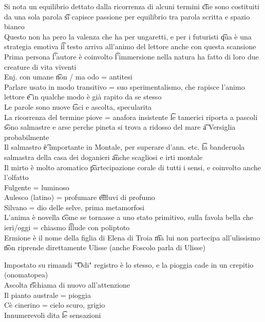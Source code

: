 \documentclass[12pt]{article}
\begin{document}
Si nota un equilibrio dettato dalla ricorrenza di alcuni termini \t che sono costituiti da una sola parola \t si capisce passione per equilibrio tra parola scritta e spazio bianco \\
Questo non ha pero la valenza che ha per ungaretti, e per i futuristi \t qua è una strategia emotiva \t il testo arriva all'animo del lettore anche con questa scansione \\
Prima persona \t l'autore è coinvolto \t l'immersione nella natura ha fatto di loro due creature di vita viventi \\
Enj. con umane \t non / ma odo = antitesi \\
Parlare usato in modo transitivo = suo sperimentalismo, che rapisce l'animo lettore \t e in qualche modo è già rapito da se stesso \\
Le parole sono nuove \t taci e ascolta, specularita \\
La ricorrenza del termine piove = anafora insistente \t le tamerici riporta a pascoli \t sono salmastre e arse perche pineta si trova a ridosso del mare \t a Versiglia probabilmente \\
Il salmastro \t è importante in Montale, per superare d'ann. etc. \t la banderuola salmastra della casa dei doganieri \t anche scagliosi e irti montale \\
Il mirto è molto aromatico \t partecipazione corale di tutti i sensi, e coinvolto anche l'olfatto \\
Fulgente = luminoso \\
Aulesco (latino) = profumare \t effluvi di profumo \\
Silvano = dio delle selve, prima metamorfosi \\
L'anima è novella \t come se tornasse a uno stato primitivo, sulla favola bella che ieri/oggi = chiasmo \t illude con poliptoto \\
Ermione è il nome della figlia di Elena di Troia \t ma lui non partecipa all'ulissismo \t non riprende direttamente Ulisse (anche Foscolo parla di Ulisse)

Impostato su rimandi \t "Odi" registro è lo stesso, e la pioggia cade in un crepitio (onomatopea) \\
Ascolta \t richiama di nuovo all'attenzione \\
Il pianto australe = pioggia \\
Cè cinerino = cielo scuro, grigio \\
Innumerevoli dita \t le sensazioni \\
\end{document}
